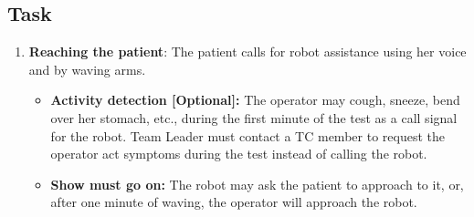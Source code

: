 \subsection{Task}
\begin{enumerate}
\item \textbf{Reaching the patient}: The patient calls for robot assistance using her voice and by waving arms.
\begin{itemize}
\item \textbf{Activity detection [Optional]:} The operator may cough, sneeze, bend over her stomach, etc., during the first minute of the test as a call signal for the robot. Team Leader must contact a TC member to request the operator act symptoms during the test instead of calling the robot.
\item \textbf{Show must go on:} The robot may ask the patient to approach to it, or, after one minute of waving, the operator will approach the robot.
\end{itemize}
 

\end{enumerate}
